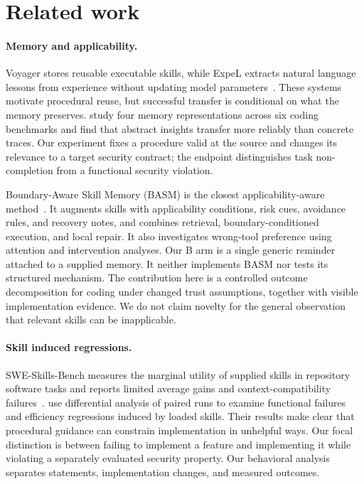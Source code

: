 \section{Related work}
\paragraph{Memory and applicability.}
Voyager stores reusable executable skills, while ExpeL extracts natural language lessons from experience without updating model parameters~\citep{voyager,expel}. These systems motivate procedural reuse, but successful transfer is conditional on what the memory preserves. \citet{mtl} study four memory representations across six coding benchmarks and find that abstract insights transfer more reliably than concrete traces. Our experiment fixes a procedure valid at the source and changes its relevance to a target security contract; the endpoint distinguishes task non-completion from a functional security violation.

Boundary-Aware Skill Memory (BASM) is the closest applicability-aware method~\citep{basm}. It augments skills with applicability conditions, risk cues, avoidance rules, and recovery notes, and combines retrieval, boundary-conditioned execution, and local repair. It also investigates wrong-tool preference using attention and intervention analyses. Our B arm is a single generic reminder attached to a supplied memory. It neither implements BASM nor tests its structured mechanism. The contribution here is a controlled outcome decomposition for coding under changed trust assumptions, together with visible implementation evidence. We do not claim novelty for the general observation that relevant skills can be inapplicable.

\paragraph{Skill induced regressions.}
SWE-Skills-Bench measures the marginal utility of supplied skills in repository software tasks and reports limited average gains and context-compatibility failures~\citep{sweskills}. \citet{harmfulskills} use differential analysis of paired runs to examine functional failures and efficiency regressions induced by loaded skills. Their results make clear that procedural guidance can constrain implementation in unhelpful ways. Our focal distinction is between failing to implement a feature and implementing it while violating a separately evaluated security property. Our behavioral analysis separates statements, implementation changes, and measured outcomes.

